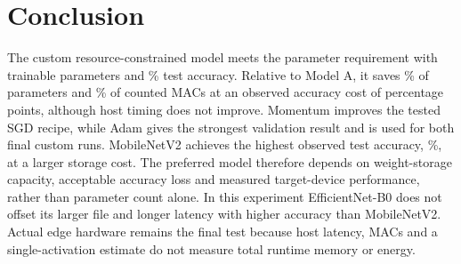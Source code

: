 \section{Conclusion}
The custom resource-constrained model meets the parameter requirement with
\BParams{} trainable parameters and \BAccuracy\% test accuracy. Relative to
Model A, it saves \ParamReduction\% of parameters and \MacReduction\% of
counted MACs at an observed accuracy cost of \CustomAccuracyGap{} percentage
points, although host timing does not improve. Momentum improves the tested
SGD recipe, while Adam gives the strongest validation result and is used for
both final custom runs. MobileNetV2 achieves the highest observed test
accuracy, \MobileAccuracy\%, at a larger storage cost. The preferred model
therefore depends on weight-storage capacity, acceptable accuracy loss and
measured target-device performance, rather than parameter count alone.
In this experiment EfficientNet-B0 does not offset its larger file and longer
latency with higher accuracy than MobileNetV2. Actual edge hardware remains the
final test because host latency, MACs and a single-activation estimate do not
measure total runtime memory or energy.
